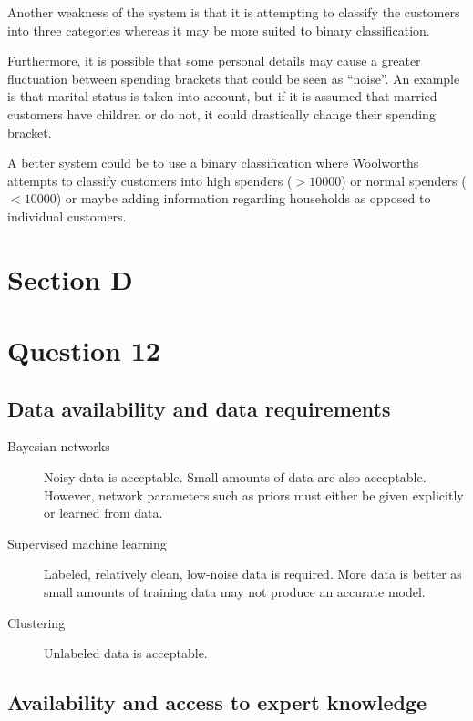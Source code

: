 \documentclass[12pt,notitlepage]{article}
\newcommand{\question}{\section*}
\begin{document}
Another weakness of the system is that it is attempting to classify the
customers into three categories whereas it may be more suited to binary
classification.

Furthermore, it is possible that some personal details may cause a greater
fluctuation between spending brackets that could be seen as ``noise''. An
example is that marital status is taken into account, but if it is assumed that
married customers have children or do not, it could drastically change their
spending bracket. 

A better system could be to use a binary classification where Woolworths
attempts to classify customers into high spenders ($> 10 000$) or normal spenders
($< 10 000$) or maybe adding information regarding households as opposed to
individual customers.

\section*{Section D}
\question{Question 12}

\subsection*{Data availability and data requirements}

\begin{description}

    \item[Bayesian networks] Noisy data is acceptable. Small amounts of data are
        also acceptable. However, network parameters such as priors must either be given
        explicitly or learned from data.

    \item[Supervised machine learning] Labeled, relatively clean, low-noise data
        is required. More data is better as small amounts of training data may
        not produce an accurate model.

    \item[Clustering] Unlabeled data is acceptable.

\end{description}

\subsection*{Availability and access to expert knowledge}
\end{document}
